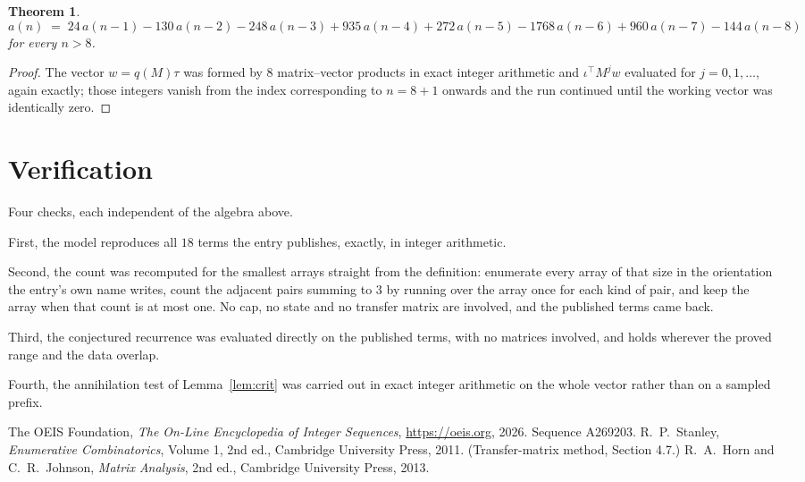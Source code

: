 \documentclass[11pt,a4paper]{article}
\theoremstyle{plain}
\newtheorem{theorem}{Theorem}
\theoremstyle{definition}
\begin{document}
\begin{theorem}
\[
a(n)\;=\;24\,a(n-1) - 130\,a(n-2) - 248\,a(n-3) + 935\,a(n-4) + 272\,a(n-5) - 1768\,a(n-6) + 960\,a(n-7) - 144\,a(n-8)
\]
for every $n>8$.
\end{theorem}

\begin{proof}
The vector $w=q(M)\tau$ was formed by $8$ matrix--vector products in exact integer
arithmetic and $\iota^{\!\top}M^{j}w$ evaluated for $j=0,1,\dots$, again exactly; those
integers vanish from the index corresponding to $n=8+1$ onwards and the run continued
until the working vector was identically zero.
\end{proof}

\section{Verification}

Four checks, each independent of the algebra above.

First, the model reproduces all $18$ terms the entry publishes, exactly, in integer
arithmetic.

Second, the count was recomputed for the smallest arrays straight from the definition:
enumerate every array of that size in the orientation the entry's own name writes, count the
adjacent pairs summing to $3$ by running over the array once for each kind of pair, and keep
the array when that count is at most one. No cap, no state and no transfer matrix are involved, and
the published terms came back.

Third, the conjectured recurrence was evaluated directly on the published terms, with no
matrices involved, and holds wherever the proved range and the data overlap.

Fourth, the annihilation test of Lemma~\ref{lem:crit} was carried out in exact integer
arithmetic on the whole vector rather than on a sampled prefix.

\begin{thebibliography}{9}
 The OEIS Foundation, \emph{The On-Line Encyclopedia of Integer
Sequences}, \url{https://oeis.org}, 2026. Sequence A269203.
 R.~P.~Stanley, \emph{Enumerative Combinatorics}, Volume 1, 2nd ed.,
Cambridge University Press, 2011. (Transfer-matrix method, Section 4.7.)
 R.~A.~Horn and C.~R.~Johnson, \emph{Matrix Analysis}, 2nd ed., Cambridge
University Press, 2013.
\end{thebibliography}
\end{document}
